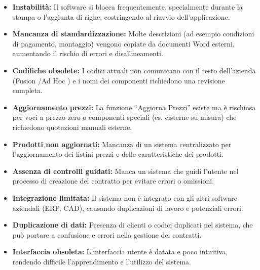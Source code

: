 \documentclass[12pt, a4paper]{article}
\begin{document}
\begin{itemize}
    \item \textbf{Instabilità:} Il software si blocca frequentemente, specialmente durante la stampa o l'aggiunta di righe, costringendo al riavvio dell'applicazione.
    \item \textbf{Mancanza di standardizzazione:} Molte descrizioni (ad esempio condizioni di pagamento, montaggio) vengono copiate da documenti Word esterni, aumentando il rischio di errori e disallineamenti.
    \item \textbf{Codifiche obsolete:} I codici attuali non comunicano con il resto dell'azienda (Fusion \cite{Fusion}/Ad Hoc \cite{Ad-Hoc}) e i nomi dei componenti richiedono una revisione completa.
    \item \textbf{Aggiornamento prezzi:} La funzione ``Aggiorna Prezzi'' esiste ma è rischiosa per voci a prezzo zero o componenti speciali (es. cisterne su misura) che richiedono quotazioni manuali esterne.
    \item \textbf{Prodotti non aggiornati:} Mancanza di un sistema centralizzato per l'aggiornamento dei listini prezzi e delle caratteristiche dei prodotti.
    \item \textbf{Assenza di controlli guidati:} Manca un sistema che guidi l'utente nel processo di creazione del contratto per evitare errori o omissioni.
    \item \textbf{Integrazione limitata:} Il sistema non è integrato con gli altri software aziendali (ERP, CAD), causando duplicazioni di lavoro e potenziali errori.
    \item \textbf{Duplicazione di dati:} Presenza di clienti o codici duplicati nel sistema, che può portare a confusione e errori nella gestione dei contratti.
    \item \textbf{Interfaccia obsoleta:} L'interfaccia utente è datata e poco intuitiva, rendendo difficile l'apprendimento e l'utilizzo del sistema.
\end{itemize}
\end{document}
